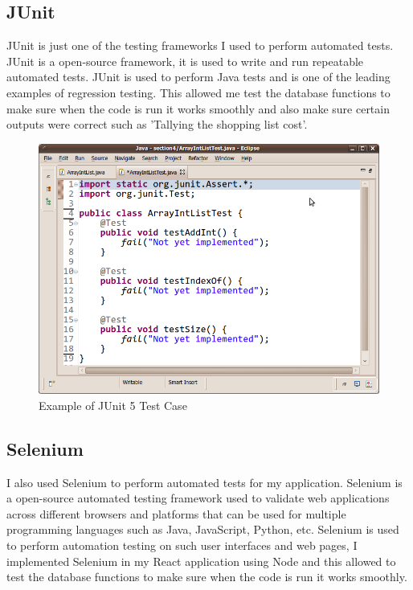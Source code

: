 \subsection{JUnit}

JUnit is just one of the testing frameworks I used to perform automated tests. JUnit is a open-source framework, it is used to write and run repeatable automated tests. JUnit is used to perform Java tests and is one of the leading examples of regression testing. This allowed me test the database functions to make sure when the code is run it works smoothly and also make sure certain outputs were correct such as 'Tallying the shopping list cost'.

\begin{figure}[H]
  \includegraphics[width=\textwidth]{img/junitcase.png}
  \caption{Example of JUnit 5 Test Case}
  \label{fig: JUnit Test Case}
\end{figure}

\subsection{Selenium}

I also used Selenium to perform automated tests for my application. 
Selenium is a open-source automated testing framework used to validate web applications across different browsers and platforms that can be used for multiple programming languages such as Java, JavaScript, Python, etc. 
Selenium is used to perform automation testing on such user interfaces and web pages, I implemented Selenium in my React application using Node and this allowed to test the database functions to make sure when the code is run it works smoothly.

